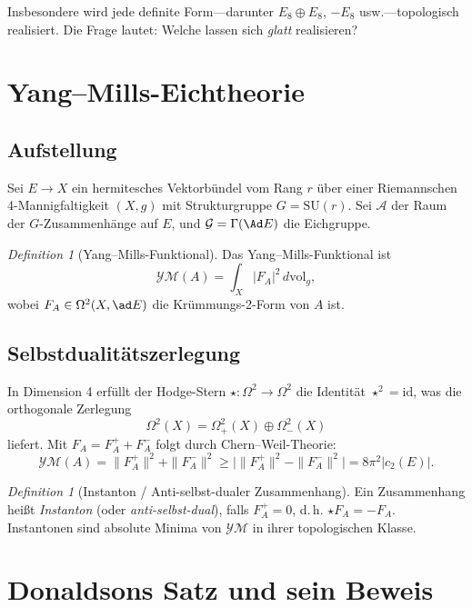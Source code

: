 \documentclass[12pt,a4paper]{amsart}
\theoremstyle{definition}
\theoremstyle{remark}
\newtheorem{definition_de}[theorem]{Definition}
\begin{document}
Insbesondere wird jede definite Form---darunter $E_8 \oplus E_8$,
$-E_8$ usw.---topologisch realisiert.  Die Frage lautet: Welche lassen sich
\emph{glatt} realisieren?

\section{Yang--Mills-Eichtheorie}

\subsection{Aufstellung}

Sei $E \to X$ ein hermitesches Vektorbündel vom Rang $r$ über einer
Riemannschen 4-Mannigfaltigkeit $(X,g)$ mit Strukturgruppe
$G = \mathrm{SU}(r)$.  Sei $\mathcal{A}$ der Raum der $G$-Zusammenhänge
auf $E$, und $\mathcal{G} = \Gamma(\Ad E)$ die Eichgruppe.

\begin{definition_de}[Yang--Mills-Funktional]
Das Yang--Mills-Funktional ist
\[
  \mathcal{YM}(A) = \int_X |F_A|^2\,d\mathrm{vol}_g,
\]
wobei $F_A \in \Omega^2(X, \ad E)$ die Krümmungs-2-Form von $A$ ist.
\end{definition_de}

\subsection{Selbstdualitätszerlegung}

In Dimension 4 erfüllt der Hodge-Stern $\star \colon \Omega^2 \to \Omega^2$
die Identität $\star^2 = \mathrm{id}$, was die orthogonale Zerlegung
\[
  \Omega^2(X) = \Omega^2_+(X) \oplus \Omega^2_-(X)
\]
liefert.  Mit $F_A = F_A^+ + F_A^-$ folgt durch Chern--Weil-Theorie:
\[
  \mathcal{YM}(A) = \|F_A^+\|^2 + \|F_A^-\|^2
  \ge \bigl|\|F_A^+\|^2 - \|F_A^-\|^2\bigr| = 8\pi^2 |c_2(E)|.
\]

\begin{definition_de}[Instanton / Anti-selbst-dualer Zusammenhang]
Ein Zusammenhang heißt \emph{Instanton} (oder \emph{anti-selbst-dual}),
falls $F_A^+ = 0$, d.\,h. $\star F_A = -F_A$.  Instantonen sind absolute
Minima von $\mathcal{YM}$ in ihrer topologischen Klasse.
\end{definition_de}

\section{Donaldsons Satz und sein Beweis}
\end{document}
